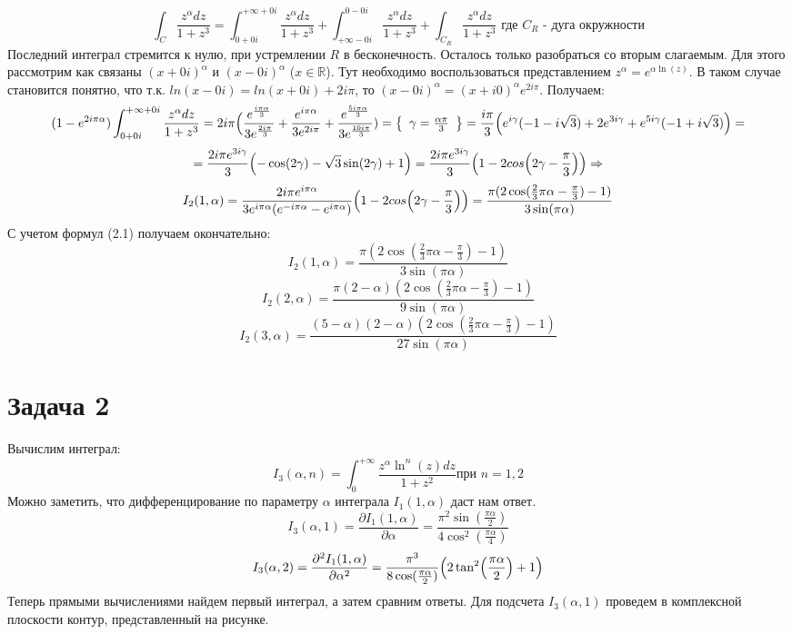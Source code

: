 \documentclass[12pt]{article}
\begin{document}
\[ \int_{C} \frac{z^\alpha dz}{1+z^3} = \int_{0+0i}^{+\infty+0i}\frac{z^\alpha dz}{1+z^3} + \int_{+\infty-0i}^{0-0i}\frac{z^\alpha dz}{1+z^3} + \int_{C_{R}}\frac{z^\alpha dz}{1+z^3} \text{ где $C_R$ - дуга окружности}\]
Последний интеграл стремится к нулю, при устремлении $R$ в бесконечность. Осталось только разобраться со вторым слагаемым. Для этого рассмотрим как связаны $(x+0i)^\alpha$ и $(x-0i)^\alpha$ ($x \in \mathbb{R}$). Тут необходимо воспользоваться представлением $z^{\alpha} = e^{\alpha \ln(z)}$. В таком случае становится понятно, что т.к. $ln(x-0i) = ln(x+0i) + 2i\pi$, то $(x-0i)^{\alpha} = (x+i0)^{\alpha}e^{2i\pi}$. Получаем:
\[ (1-e^{2i\pi\alpha})\int_{0+0i}^{+\infty+0i}\frac{z^\alpha dz}{1+z^3} = 2i\pi \Bigl( \frac{e^{\frac{i\pi\alpha}{3}}}{3e^{\frac{2i\pi}{3}}} + \frac{e^{i\pi\alpha}}{3e^{2i\pi}} + \frac{e^{\frac{5i\pi\alpha}{3}}}{3e^{\frac{10i\pi}{3}}}) = 
\left\{\begin{array}[c]{ll} \gamma = \frac{\alpha\pi}{3} \end{array}\right\} 
= \frac{i\pi}{3}\Bigl(  e^{i\gamma}(-1-i\sqrt{3}) + 2e^{3i\gamma} + e^{5i\gamma}(-1+i\sqrt{3})  \Bigr) = \]
\[
= \frac{2i\pi e^{3i\gamma}}{3}\Bigl(  -\cos(2\gamma) - \sqrt{3}\sin(2\gamma) +1 \Bigr) = \frac{2i\pi e^{3i\gamma}}{3}\Bigl(1-2cos\Bigl(2\gamma - \frac{\pi}{3}\Bigr) \Bigr) \Rightarrow
\]
\[I_2(1,\alpha) = \frac{2i\pi e^{i\pi\alpha}}{3e^{i\pi\alpha}(e^{-i\pi\alpha}-e^{i\pi\alpha})}\Bigl(1-2cos\Bigl(2\gamma - \frac{\pi}{3}\Bigr) \Bigr) = \frac{\pi(2\cos(\frac{2}{3}\pi\alpha-\frac{\pi}{3})-1)}{3\sin(\pi\alpha)}\]
С учетом формул (2.1) получаем окончательно:
\[\boxed{I_2(1,\alpha) = \frac{\pi(2\cos(\frac{2}{3}\pi\alpha-\frac{\pi}{3})-1)}{3\sin(\pi\alpha)}}\]
\[\boxed{I_2(2,\alpha) = \frac{\pi(2-\alpha)(2\cos(\frac{2}{3}\pi\alpha-\frac{\pi}{3})-1)}{9\sin(\pi\alpha)}}\]
\[\boxed{I_2(3,\alpha) = \frac{(5-\alpha)(2-\alpha)(2\cos(\frac{2}{3}\pi\alpha-\frac{\pi}{3})-1)}{27\sin(\pi\alpha)}}\]
\pagebreak
\section*{Задача 2}
Вычислим интеграл:
\[I_3(\alpha,n) = \int_{0}^{+\infty}\frac{z^\alpha \ln^n(z) dz}{1+z^2} \text{при $n = 1,2$}\]
Можно заметить, что дифференцирование по параметру $\alpha$ интеграла $I_1(1,\alpha)$ даст нам ответ.
\[I_3(\alpha,1) = \frac{\partial I_1(1,\alpha)}{\partial \alpha} = \frac{\pi^2 \sin(\frac{\pi\alpha}{2})}{4\cos^2(\frac{\pi\alpha}{4})}\]
\[I_3(\alpha,2) = \frac{\partial^2 I_1(1,\alpha)}{\partial \alpha^2} = \frac{\pi^3 }{8\cos(\frac{\pi\alpha}{2})} \Bigl(2\tan^2\Bigl(\frac{\pi\alpha}{2}\Bigr)+1\Bigr)\]
Теперь прямыми вычислениями найдем первый интеграл, а затем сравним ответы. Для подсчета $I_3(\alpha,1)$ проведем в комплексной плоскости контур, представленный на рисунке.
\end{document}
